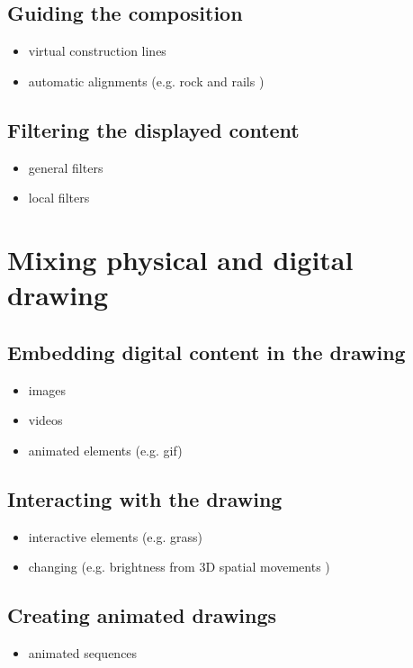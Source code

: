 \documentclass{sigchi}
\begin{document}
\subsection{Guiding the composition}
\begin{itemize}
  \item virtual construction lines
  \item automatic alignments (e.g. rock and rails )
\end{itemize}

\subsection{Filtering the displayed content}
\begin{itemize}
  \item general filters
  \item local filters 
\end{itemize}


\section{Mixing physical and digital drawing}

\subsection{Embedding digital content in the drawing}
\begin{itemize}
  \item images
  \item videos 
  \item animated elements (e.g. gif) 
\end{itemize}

\subsection{Interacting with the drawing}
\begin{itemize}
  \item interactive elements (e.g. grass)
  \item changing (e.g. brightness from 3D spatial movements ) 
\end{itemize}

\subsection{Creating animated drawings}
\begin{itemize}
  \item animated sequences 
\end{itemize}
\end{document}
